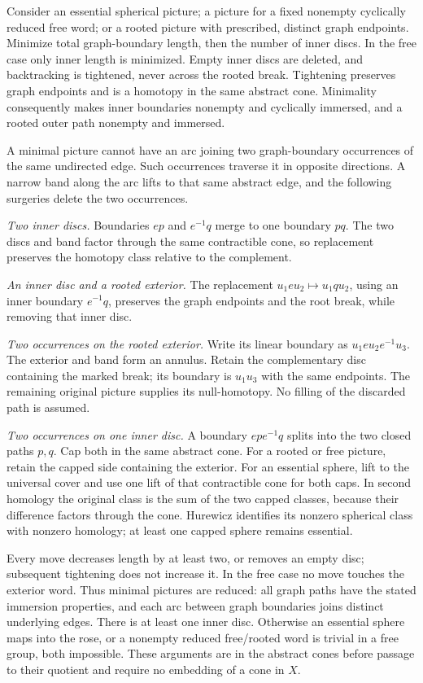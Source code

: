 Consider an essential spherical picture; a picture for a fixed nonempty cyclically reduced free word; or a rooted picture with prescribed, distinct graph endpoints. Minimize total graph-boundary length, then the number of inner discs. In the free case only inner length is minimized. Empty inner discs are deleted, and backtracking is tightened, never across the rooted break. Tightening preserves graph endpoints and is a homotopy in the same abstract cone. Minimality consequently makes inner boundaries nonempty and cyclically immersed, and a rooted outer path nonempty and immersed.

A minimal picture cannot have an arc joining two graph-boundary occurrences of the same undirected edge. Such occurrences traverse it in opposite directions. A narrow band along the arc lifts to that same abstract edge, and the following surgeries delete the two occurrences.

\emph{Two inner discs.} Boundaries $ep$ and $e^{-1}q$ merge to one boundary $pq$. The two discs and band factor through the same contractible cone, so replacement preserves the homotopy class relative to the complement.

\emph{An inner disc and a rooted exterior.} The replacement $u_1eu_2\mapsto u_1qu_2$, using an inner boundary $e^{-1}q$, preserves the graph endpoints and the root break, while removing that inner disc.

\emph{Two occurrences on the rooted exterior.} Write its linear boundary as $u_1eu_2e^{-1}u_3$. The exterior and band form an annulus. Retain the complementary disc containing the marked break; its boundary is $u_1u_3$ with the same endpoints. The remaining original picture supplies its null-homotopy. No filling of the discarded path is assumed.

\emph{Two occurrences on one inner disc.} A boundary $epe^{-1}q$ splits into the two closed paths $p,q$. Cap both in the same abstract cone. For a rooted or free picture, retain the capped side containing the exterior. For an essential sphere, lift to the universal cover and use one lift of that contractible cone for both caps. In second homology the original class is the sum of the two capped classes, because their difference factors through the cone. Hurewicz identifies its nonzero spherical class with nonzero homology; at least one capped sphere remains essential.

Every move decreases length by at least two, or removes an empty disc; subsequent tightening does not increase it. In the free case no move touches the exterior word. Thus minimal pictures are reduced: all graph paths have the stated immersion properties, and each arc between graph boundaries joins distinct underlying edges. There is at least one inner disc. Otherwise an essential sphere maps into the rose, or a nonempty reduced free/rooted word is trivial in a free group, both impossible. These arguments are in the abstract cones before passage to their quotient and require no embedding of a cone in $X$.

